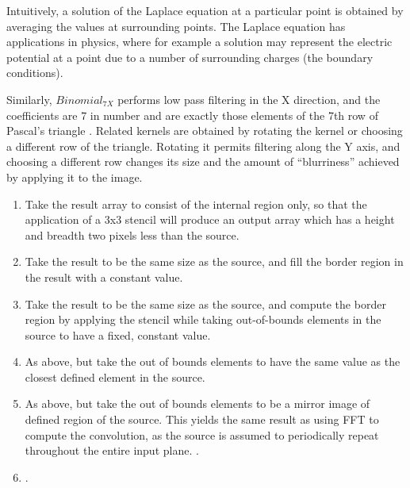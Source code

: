 
Intuitively, a solution of the Laplace equation at a particular point is obtained by averaging the values at surrounding points. The Laplace equation has applications in physics, where for example a solution may represent the electric potential at a point due to a number of surrounding charges (the boundary conditions). 


Similarly, $Binomial_{7X}$ performs low pass filtering in the X direction, and the coefficients are 7 in number and are exactly those elements of the 7th row of Pascal's triangle \cite{aubury:binomial-filters}. Related kernels are obtained by rotating the kernel or choosing a different row of the triangle. Rotating it permits filtering along the Y axis, and choosing a different row changes its size and the amount of ``blurriness'' achieved by applying it to the image.

\begin{enumerate}
\item	Take the result array to consist of the internal region only, so that the application of a 3x3 stencil will produce an output array which has a height and breadth two pixels less than the source.

\item	Take the result to be the same size as the source, and fill the border region in the result with a constant value.

\item	Take the result to be the same size as the source, and compute the border region by applying the stencil while taking out-of-bounds elements in the source to have a fixed, constant value.

\item	As above, but take the out of bounds elements to have the same value as the closest defined element in the source.

\item	As above, but take the out of bounds elements to be a mirror image of defined region of the source. This yields the same result as using FFT to compute the convolution, as the source is assumed to periodically repeat throughout the entire input plane. \CITE.

\item	{}.
\end{enumerate}

